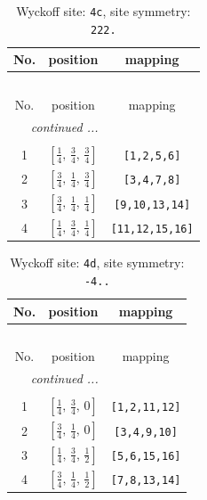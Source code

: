 \documentclass[fleqn,8pt]{jsarticle}
\begin{document}
\renewcommand{\arraystretch}{1.2}
\begin{longtable}{ccc}
\caption{Wyckoff site: {\tt 4c}, site symmetry: {\tt 222.}}
 \\
 \hline \hline
No. & position & mapping \\ \hline \endfirsthead

\multicolumn{2}{l}{\tablename\ \thetable{}} \\
 \hline \hline
No. & position & mapping \\ \hline \endhead

 \hline \hline
\multicolumn{2}{r}{\footnotesize\it continued ...} \\ \endfoot

 \hline \hline
\multicolumn{2}{r}{} \\ \endlastfoot

1 & $\left[ \frac{1}{4},\, \frac{3}{4},\, \frac{3}{4} \right]$ & {\tt [1,2,5,6]} \\ \hline
2 & $\left[ \frac{3}{4},\, \frac{1}{4},\, \frac{3}{4} \right]$ & {\tt [3,4,7,8]} \\ \hline
3 & $\left[ \frac{3}{4},\, \frac{1}{4},\, \frac{1}{4} \right]$ & {\tt [9,10,13,14]} \\ \hline
4 & $\left[ \frac{1}{4},\, \frac{3}{4},\, \frac{1}{4} \right]$ & {\tt [11,12,15,16]} \\
\end{longtable}
\renewcommand{\arraystretch}{1.2}
\begin{longtable}{ccc}
\caption{Wyckoff site: {\tt 4d}, site symmetry: {\tt -4..}}
 \\
 \hline \hline
No. & position & mapping \\ \hline \endfirsthead

\multicolumn{2}{l}{\tablename\ \thetable{}} \\
 \hline \hline
No. & position & mapping \\ \hline \endhead

 \hline \hline
\multicolumn{2}{r}{\footnotesize\it continued ...} \\ \endfoot

 \hline \hline
\multicolumn{2}{r}{} \\ \endlastfoot

1 & $\left[ \frac{1}{4},\, \frac{3}{4},\, 0 \right]$ & {\tt [1,2,11,12]} \\ \hline
2 & $\left[ \frac{3}{4},\, \frac{1}{4},\, 0 \right]$ & {\tt [3,4,9,10]} \\ \hline
3 & $\left[ \frac{1}{4},\, \frac{3}{4},\, \frac{1}{2} \right]$ & {\tt [5,6,15,16]} \\ \hline
4 & $\left[ \frac{3}{4},\, \frac{1}{4},\, \frac{1}{2} \right]$ & {\tt [7,8,13,14]} \\
\end{longtable}
\end{document}

